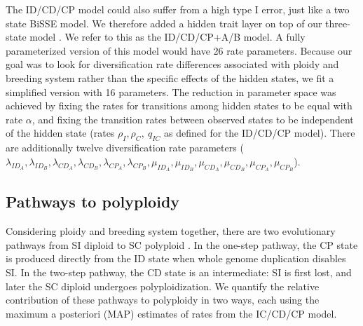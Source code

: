 The ID/CD/CP model could also suffer from a high type I error, just like a two state BiSSE model. 
We therefore added a hidden trait layer on top of our three-state model \citep[analogous to][]{caetano_2018,  huang_2018}.
We refer to this as the ID/CD/CP+A/B model.
A fully parameterized version of this model would have 26 rate parameters. 
Because our goal was to look for diversification rate differences associated with ploidy and breeding system rather than the specific effects of the hidden states, we fit a simplified version with 16 parameters. %
The reduction in parameter space was achieved by fixing the rates for transitions among hidden states to be equal with rate $\alpha$, and fixing the transition rates between observed states to be independent of the hidden state (rates $\rho_I,\rho_C,\ q_{IC}$ as defined for the ID/CD/CP model).
There are additionally twelve diversification rate parameters ($\lambda_{ID_A},  \lambda_{ID_B},  \lambda_{CD_A}, \lambda_{CD_B}, \lambda_{CP_A}, \lambda_{CP_B}, \mu_{ID_A}, \mu_{ID_B}, \mu_{CD_A}, \mu_{CD_B},  \mu_{CP_A}, \mu_{CP_B}$).

\subsection{Pathways to polyploidy}

Considering ploidy and breeding system together, there are two evolutionary pathways from SI diploid to SC polyploid \citep{brunet2001, robertson_2011}.
In the one-step pathway, the CP state is produced directly from the ID state when whole genome duplication disables SI.
In the two-step pathway, the CD state is an intermediate: SI is first lost, and later the SC diploid undergoes polyploidization.
We quantify the relative contribution of these pathways to polyploidy in two ways, each using the maximum a posteriori (MAP) estimates of rates from the IC/CD/CP model.

